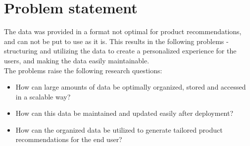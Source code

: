 \section{Problem statement}
The data was provided in a format not optimal for product recommendations, and can not be put to use as it is. This results in the following problems - structuring and utilizing the data to create a personalized experience for the users, and making the data easily maintainable. \\
The problems raise the following research questions:
\begin{itemize}
\item How can large amounts of data be optimally organized, stored and accessed in a scalable way?
\item How can this data be maintained and updated easily after deployment?
\item How can the organized data be utilized to generate tailored product recommendations for the end user?
\end{itemize}

